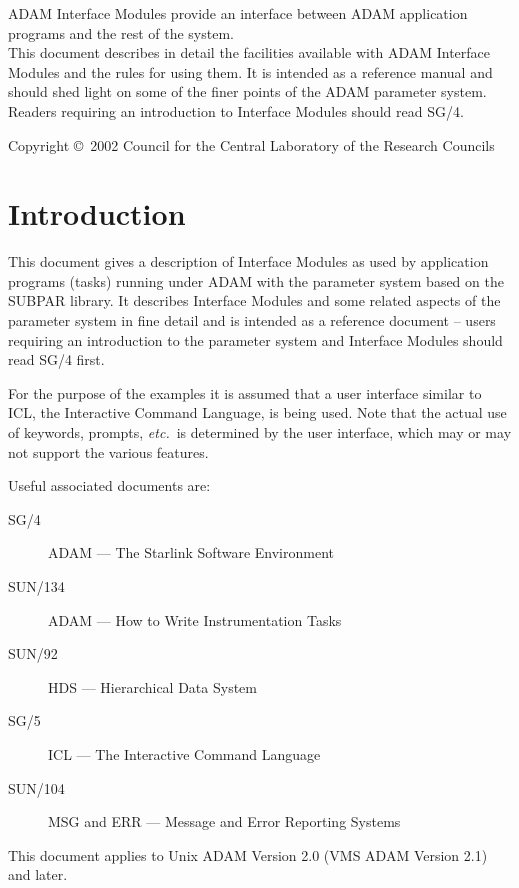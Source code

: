 \documentclass[twoside,11pt]{article}
\newcommand{\stardocinitials}  {SUN}
\newcommand{\stardoccopyright}
{Copyright \copyright\ 2002 Council for the Central Laboratory of the Research Councils}
\newcommand{\stardocnumber}    {115.3}
\newcommand{\stardocabstract}  {
ADAM Interface Modules provide an interface between ADAM application programs
and the rest of the system.
\\
This document describes in detail the facilities available with ADAM Interface
Modules and the rules for using them. It is intended as a reference manual and
should shed light on some of the finer points of the ADAM parameter system.
Readers requiring an introduction to Interface Modules should read
\xref{SG/4}{sg4}{}.
}
\newcommand{\stardocname}{\stardocinitials /\stardocnumber}
\newenvironment{latexonly}{}{}
\newcommand{\xref}[3]{#1}
\newcommand{\xlabel}[1]{}
\renewcommand{\_}{\texttt{\symbol{95}}}
\renewcommand{\thepage}{\roman{page}}
\begin{document}
\stardocabstract

\begin{latexonly}
\newpage
\vspace*{\fill}
\stardoccopyright
\end{latexonly}

  \newpage
  \begin{latexonly}
    \setlength{\parskip}{0mm}
    \tableofcontents
    \setlength{\parskip}{\medskipamount}
    \markboth{\stardocname}{\stardocname}
  \end{latexonly}

\cleardoublepage
\renewcommand{\thepage}{\arabic{page}}
\setcounter{page}{1}


\section{Introduction\xlabel{introduction}}
This document gives a description of Interface Modules as used by
application programs (tasks) running under ADAM with the parameter system
based on the SUBPAR library.
It describes Interface Modules and some related aspects of the parameter
system in fine detail and is intended as a reference document --
users requiring an introduction to the parameter system and Interface Modules
should read \xref{SG/4}{sg4}{} first.

For the purpose of the examples it is assumed that a user interface
similar to ICL, the Interactive Command Language, is being used.
Note that the actual use of keywords, prompts, {\em etc.}\ is
determined by the user interface, which may or may not support the
various features.

Useful associated documents are:
\begin{description}
\item[\xref{SG/4}{sg4}{}] ADAM --- The Starlink Software Environment
\item[\xref{SUN/134}{sun134}{}] ADAM --- How to Write Instrumentation Tasks
\item[\xref{SUN/92}{sun92}{}] HDS --- Hierarchical Data System
\item[\xref{SG/5}{sg5}{}] ICL --- The Interactive Command Language
\item[\xref{SUN/104}{sun104}{}] MSG and ERR --- Message and Error Reporting
Systems
\end{description}
This document applies to Unix ADAM Version 2.0 (VMS ADAM Version 2.1) and
later.
\end{document}
